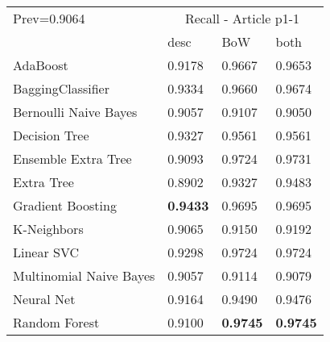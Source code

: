 \begin{tabular}{|l|l|l|l| }
\hline
Prev=0.9064 &  \multicolumn{3}{c|}{Recall - Article p1-1} \\
\cline{2-4} & desc & BoW & both \\ \hline
AdaBoost                & 0.9178 & 0.9667 & 0.9653\\
BaggingClassifier       & 0.9334 & 0.9660 & 0.9674\\
Bernoulli Naive Bayes   & 0.9057 & 0.9107 & 0.9050\\
Decision Tree           & 0.9327 & 0.9561 & 0.9561\\
Ensemble Extra Tree     & 0.9093 & 0.9724 & 0.9731\\
Extra Tree              & 0.8902 & 0.9327 & 0.9483\\
Gradient Boosting       & {\bf 0.9433} & 0.9695 & 0.9695\\
K-Neighbors             & 0.9065 & 0.9150 & 0.9192\\
Linear SVC              & 0.9298 & 0.9724 & 0.9724\\
Multinomial Naive Bayes & 0.9057 & 0.9114 & 0.9079\\
Neural Net              & 0.9164 & 0.9490 & 0.9476\\
Random Forest           & 0.9100 & {\bf 0.9745} & {\bf 0.9745}\\
\hline
\end{tabular}